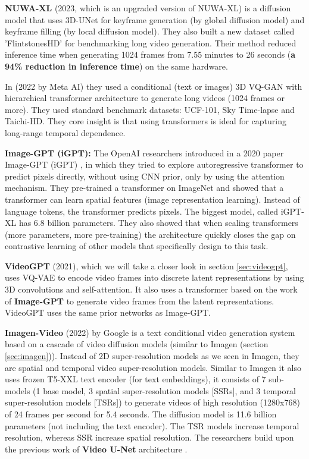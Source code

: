 \textbf{NUWA-XL} \cite{nuwa_xl} (2023, which is an upgraded version of NUWA-XL) is a diffusion model that uses 3D-UNet for keyframe generation (by global diffusion model) and keyframe filling (by local diffusion model). They also built a new dataset called 'FlintstonesHD' for benchmarking long video generation. Their method reduced inference time when generating 1024 frames from 7.55 minutes to 26 seconds (\textbf{a 94\% reduction in inference time}) on the same hardware.

In \cite{ge2022long} (2022 by Meta AI) they used a conditional (text or images) 3D VQ-GAN with hierarchical transformer architecture to generate long videos (1024 frames or more). They used standard benchmark datasets: UCF-101, Sky Time-lapse and Taichi-HD. They core insight is that using transformers is ideal for capturing long-range temporal dependence.

\textbf{Image-GPT (iGPT):} The OpenAI researchers introduced in a 2020 paper Image-GPT (iGPT) \cite{imagegpt}, in which they tried to explore autoregressive transformer to predict pixels directly, without using CNN prior, only by using the attention mechanism. They pre-trained a transformer on ImageNet and showed that a transformer can learn spatial features (image representation learning). Instead of language tokens, the transformer predicts pixels. The biggest model, called iGPT-XL has 6.8 billion parameters. They also showed that when scaling transformers (more parameters, more pre-training) the architecture quickly closes the gap on contrastive learning of other models that specifically design to this task.

\textbf{VideoGPT} \cite{videogpt} (2021), which we will take a closer look in section \ref{sec:videogpt}, uses VQ-VAE to encode video frames into discrete latent representations by using 3D convolutions and self-attention. It also uses a transformer based on the work of \textbf{Image-GPT} \cite{imagegpt} to generate video frames from the latent representations. VideoGPT uses the same prior networks as Image-GPT.

\textbf{Imagen-Video} \cite{imagen_video} (2022) by Google is a text conditional video generation system based on a cascade of video diffusion models (similar to Imagen (section \ref{sec:imagen})). Instead of 2D super-resolution models as we seen in Imagen, they are spatial and temporal video super-resolution models. Similar to Imagen it also uses frozen T5-XXL \cite{t5_model} text encoder (for text embeddings), it consists of 7 sub-models (1 base model, 3 spatial super-resolution models [SSRs], and 3 temporal super-resolution models [TSRs]) to generate videos of high resolution (1280x768) of 24 frames per second for 5.4 seconds. The diffusion model is 11.6 billion parameters (not including the text encoder). The TSR models increase temporal resolution, whereas SSR increase spatial resolution. The researchers build upon the previous work of \textbf{Video U-Net} architecture \cite{video_diffusion_models}.

